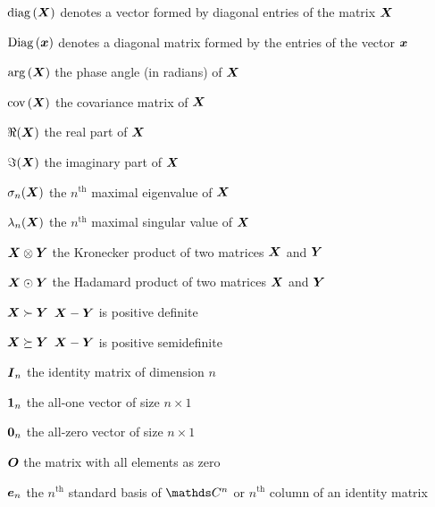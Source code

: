 \begin{list}
	\item[$\mathrm{diag}\left(\boldsymbol{X}\right)$\hfill] denotes a vector formed by diagonal entries of the matrix $\boldsymbol{X}$
	
	\item[$\mathrm{Diag}\left(\boldsymbol{x}\right)$\hfill] denotes a diagonal matrix formed by the entries of the vector $\boldsymbol{x}$
	
	\item[$\arg{(\boldsymbol{X})}$\hfill] the phase angle (in radians) of $\boldsymbol{X}$
	
	\item[$\mathrm{cov}\left(\boldsymbol{X}\right)$\hfill] the covariance matrix of $\boldsymbol{X}$
	
	\item[$\Re{(\boldsymbol{X})}$\hfill] the real part of $\boldsymbol{X}$
	
	\item[$\Im{(\boldsymbol{X})}$\hfill] the imaginary part of $\boldsymbol{X}$
	
	\item[$\sigma_{n}(\boldsymbol{X})$\hfill] the $n^\text{th}$ maximal eigenvalue of $\boldsymbol{X}$
	
	\item[$\lambda_{n}(\boldsymbol{X})$\hfill] the $n^\text{th}$ maximal singular value of $\boldsymbol{X}$

	\item[$\boldsymbol{X} \otimes \boldsymbol{Y}$\hfill] the Kronecker product of two matrices $\boldsymbol{X}$ and $\boldsymbol{Y}$

	\item[$\boldsymbol{X} \odot \boldsymbol{Y}$\hfill] the Hadamard product of two matrices $\boldsymbol{X}$ and $\boldsymbol{Y}$
	
	\item[$\boldsymbol{X} \succ \boldsymbol{Y}$\hfill] $\boldsymbol{X}-\boldsymbol{Y}$ is positive definite
	
	\item[$\boldsymbol{X} \succeq \boldsymbol{Y}$\hfill] $\boldsymbol{X}-\boldsymbol{Y}$ is positive semidefinite
	
	\item[$\boldsymbol{I}_n$ \hfill] the identity matrix of dimension $n$
	
	\item[$\boldsymbol{1}_n$ \hfill] the all-one vector of size $n\times 1$
	
	\item[$\boldsymbol{0}_n$ \hfill] the all-zero vector of size $n\times 1$
	
	\item[$\boldsymbol{O}$ \hfill] the matrix with all elements as zero
	
	\item[$\boldsymbol{e}_n$\hfill] the $n^\text{th}$ standard basis of $\complexC{n}$ or $n^\text{th}$ column of an identity matrix
	

\end{list}

